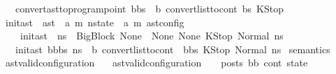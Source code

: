\begin{isabellebody}
\ \ {\isacharbar}{\kern0pt}\ {\isachardoublequoteopen}convert{\isacharunderscore}{\kern0pt}ast{\isacharunderscore}{\kern0pt}to{\isacharunderscore}{\kern0pt}program{\isacharunderscore}{\kern0pt}point\ {\isacharparenleft}{\kern0pt}b{\isacharhash}{\kern0pt}bs{\isacharparenright}{\kern0pt}\ {\isacharequal}{\kern0pt}\ {\isacharparenleft}{\kern0pt}b{\isacharcomma}{\kern0pt}\ convert{\isacharunderscore}{\kern0pt}list{\isacharunderscore}{\kern0pt}to{\isacharunderscore}{\kern0pt}cont\ bs\ KStop{\isacharparenright}{\kern0pt}{\isachardoublequoteclose}\isanewline
\isanewline
{}\isamarkupfalse%
\ init{\isacharunderscore}{\kern0pt}ast\ {\isacharcolon}{\kern0pt}{\isacharcolon}{\kern0pt}\ {\isachardoublequoteopen}ast\ {\isasymRightarrow}\ {\isacharparenleft}{\kern0pt}{\isacharprime}{\kern0pt}a{\isacharcomma}{\kern0pt}\ {\isacharprime}{\kern0pt}m{\isacharparenright}{\kern0pt}\ nstate\ {\isasymRightarrow}\ {\isacharparenleft}{\kern0pt}{\isacharprime}{\kern0pt}a{\isacharcomma}{\kern0pt}\ {\isacharprime}{\kern0pt}m{\isacharparenright}{\kern0pt}\ ast{\isacharunderscore}{\kern0pt}config{\isachardoublequoteclose}\isanewline
\ \ \isanewline
\ \ \ \ {\isachardoublequoteopen}init{\isacharunderscore}{\kern0pt}ast\ {\isacharbrackleft}{\kern0pt}{\isacharbrackright}{\kern0pt}\ ns{}\ {\isacharequal}{\kern0pt}\ {\isacharparenleft}{\kern0pt}{\isacharparenleft}{\kern0pt}BigBlock\ None\ {\isacharbrackleft}{\kern0pt}{\isacharbrackright}{\kern0pt}\ None\ None{\isacharparenright}{\kern0pt}{\isacharcomma}{\kern0pt}\ KStop{\isacharcomma}{\kern0pt}\ Normal\ ns{}{\isacharparenright}{\kern0pt}{\isachardoublequoteclose}\isanewline
\ \ {\isacharbar}{\kern0pt}\ {\isachardoublequoteopen}init{\isacharunderscore}{\kern0pt}ast\ {\isacharparenleft}{\kern0pt}b{\isacharhash}{\kern0pt}bbs{\isacharparenright}{\kern0pt}\ ns{}\ {\isacharequal}{\kern0pt}\ {\isacharparenleft}{\kern0pt}b{\isacharcomma}{\kern0pt}\ convert{\isacharunderscore}{\kern0pt}list{\isacharunderscore}{\kern0pt}to{\isacharunderscore}{\kern0pt}cont\ {\isacharparenleft}{\kern0pt}\ bbs{\isacharparenright}{\kern0pt}\ KStop{\isacharcomma}{\kern0pt}\ Normal\ ns{}{\isacharparenright}{\kern0pt}{\isachardoublequoteclose}\isanewline
\isanewline
\isanewline
{}\isamarkupfalse%
\ semantics\ \isanewline
\isanewline
{}\isamarkupfalse%
\ ast{\isacharunderscore}{\kern0pt}valid{\isacharunderscore}{\kern0pt}configuration\isanewline
\ \ \ {\isachardoublequoteopen}ast{\isacharunderscore}{\kern0pt}valid{\isacharunderscore}{\kern0pt}configuration\ {\isasymLambda}\ {\isasymGamma}\ {\isasymOmega}\ posts\ bb\ cont\ state\ {\isasymequiv}\isanewline

\end{isabellebody}
